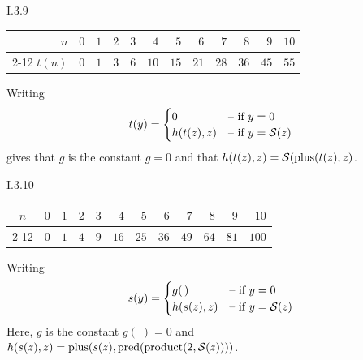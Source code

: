 %
\begin{ans}{I.3.9}
\begin{exparts}
\item
\begin{center}
\begin{tabular}{r|*{11}{r}}
  $n$
    &$0$ &$1$ &$2$ &$3$ &$4$  &$5$  &$6$  &$7$  &$8$  &$9$  &$10$  \\
  \cline{2-12}
  $t(n)$
    &$0$ &$1$ &$3$ &$6$ &$10$ &$15$ &$21$ &$28$ &$36$ &$45$ &$55$
\end{tabular}
\end{center}
\item Writing
\begin{equation*}
  t(y)=
  \begin{cases}
  0  &\text{-- if $y=0$}  \\
  h(t(z),z)  &\text{-- if $y=\operatorname{\mathcal{S}}(z)$}
  \end{cases}
\end{equation*}
gives that $g$ is the constant $g=0$ and that
$h(t(z),z)=\operatorname{\mathcal{S}}(\operatorname{plus}(t(z),z)$.
\end{exparts}
\end{ans}
%
\begin{ans}{I.3.10}
\begin{exparts}
\item
\begin{center}
\begin{tabular}{r|*{11}{r}}
  \multicolumn{1}{c}{$n$}
    &$0$ &$1$ &$2$ &$3$ &$4$  &$5$  &$6$  &$7$  &$8$  &$9$  &$10$  \\
  \cline{2-12}
  \multicolumn{1}{c}{$t(n)$}
    &$0$ &$1$ &$4$ &$9$ &$16$ &$25$ &$36$ &$49$ &$64$ &$81$ &$100$
\end{tabular}
\end{center}
\item Writing
\begin{equation*}
  s(y)=
  \begin{cases}
  g(\,)  &\text{-- if $y=0$}  \\
  h(s(z),z)  &\text{-- if $y=\operatorname{\mathcal{S}}(z)$}
  \end{cases}
\end{equation*}
Here, $g$ is the constant $g(\;)=0$ and
$h(s(z),z)=\operatorname{plus}(s(z),\operatorname{pred}(\operatorname{product}(2,\operatorname{\mathcal{S}}(z))))$.
\end{exparts}
\end{ans}
%
